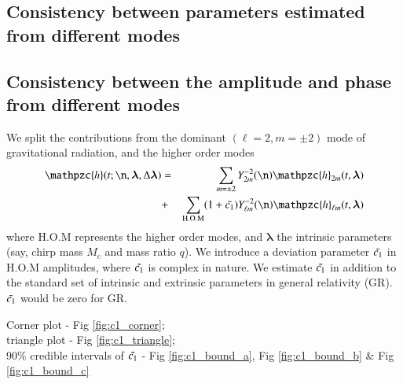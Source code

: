 \documentclass[prd,preprintnumbers,twocolumn,eqsecnum,floatfix,a4paper,nofootinbib,superscriptaddress]{revtex4}
\newcommand{\h}{\mathpzc{h}}
\newcommand{\hlm}{\mathpzc{h}_{\ell m}}
\newcommand{\Ylm}{{Y}^{-2}_{\ell m}}
\newcommand{\blambda}{\bm{\lambda}}
\begin{document}
\subsection{Consistency between parameters estimated from different modes}
\subsection{Consistency between the amplitude and phase from different modes}
We split the contributions from the dominant $(\ell = 2, m = \pm 2)$ mode of gravitational radiation, and the higher order modes 
\begin{eqnarray}
\h(t; \n, \blambda, \Delta \blambda) & = & \sum_{m = \pm2} Y^{-2}_{2m} (\n) {\h}_{2m}(t, \blambda)  \nonumber \\ 
& + & \sum _{\text{H.O.M}} (1+\Tilde{c_1})\Ylm (\n) \hlm(t, \blambda)
\label{eq:test_amp}
\end{eqnarray}
where  H.O.M represents the higher order modes, and $\blambda$ the intrinsic parameters (say, chirp mass $M_c$ and mass ratio $q$). We introduce a deviation parameter $\Tilde{c_1}$ in H.O.M amplitudes, where $\Tilde{c_1}$ is complex in nature. We estimate $\Tilde{c_1}$ in addition to the standard set of intrinsic and extrinsic parameters in general relativity (GR). $\Tilde{c_1}$ would be zero for GR.

\newpage 
\noindent Corner plot  - Fig \ref{fig:c1_corner};\\
triangle plot - Fig \ref{fig:c1_triangle};\\
90\% credible intervals of $\Tilde{c_1}$  - Fig \ref{fig:c1_bound_a}, Fig \ref{fig:c1_bound_b} \& Fig \ref{fig:c1_bound_c}
\newpage
\end{document}
